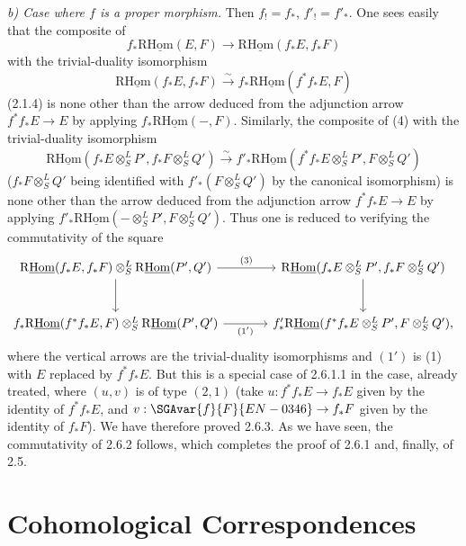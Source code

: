 \emph{b) Case where $f$ is a proper morphism.} Then $f_!=f_*$, $f'_!=f'_*$. One sees easily that the composite of
\[
f_*\mathrm{R}\underline{\mathrm{Hom}}(E,F)\longrightarrow\mathrm{R}\underline{\mathrm{Hom}}(f_*E,f_*F)
\]
with the trivial-duality isomorphism
\[
\mathrm{R}\underline{\mathrm{Hom}}(f_*E,f_*F)\xrightarrow{\sim}f_*\mathrm{R}\underline{\mathrm{Hom}}(f^{*}f_*E,F)
\]
(2.1.4) is none other than the arrow deduced from the adjunction arrow $f^{*}f_*E\to E$ by applying $f_*\mathrm{R}\underline{\mathrm{Hom}}(-,F)$. Similarly, the composite of (4) with the trivial-duality isomorphism
\[
\mathrm{R}\underline{\mathrm{Hom}}(f_*E\otimes^L_SP',f_*F\otimes^L_SQ')\xrightarrow{\sim}f'_*\mathrm{R}\underline{\mathrm{Hom}}(f^{*}f_*E\otimes^L_SP',F\otimes^L_SQ')
\]
($f_*F\otimes^L_SQ'$ being identified with $f'_*(F\otimes^L_SQ')$ by the canonical isomorphism) is none other than the arrow deduced from the adjunction arrow $f^{*}f_*E\to E$ by applying $f'_*\mathrm{R}\underline{\mathrm{Hom}}(-\otimes^L_SP',F\otimes^L_SQ')$. Thus one is reduced to verifying the commutativity of the square
\[
\begin{tikzcd}[column sep=large,row sep=large]
\mathrm{R}\underline{\mathrm{Hom}}(f_*E,f_*F)\otimes^L_S\mathrm{R}\underline{\mathrm{Hom}}(P',Q') \arrow[r,"(3)"] \arrow[d] & \mathrm{R}\underline{\mathrm{Hom}}(f_*E\otimes^L_SP',f_*F\otimes^L_SQ') \arrow[d]\\
f_*\mathrm{R}\underline{\mathrm{Hom}}(f^{*}f_*E,F)\otimes^L_S\mathrm{R}\underline{\mathrm{Hom}}(P',Q') \arrow[r,"(1')"'] & f'_*\mathrm{R}\underline{\mathrm{Hom}}(f^{*}f_*E\otimes^L_SP',F\otimes^L_SQ'),
\end{tikzcd}
\]
where the vertical arrows are the trivial-duality isomorphisms and $(1')$ is (1) with $E$ replaced by $f^{*}f_*E$. But this is a special case of 2.6.1.1 in the case, already treated, where $(u,v)$ is of type $(2,1)$ (take $u:f^{*}f_*E\to f_*E$ given by the identity of $f^{*}f_*E$, and $v:\SGAvar{f}{F}{EN-0346}\to f_*F$ given by the identity of $f_*F$). We have therefore proved 2.6.3. As we have seen, the commutativity of 2.6.2 follows, which completes the proof of 2.6.1 and, finally, of 2.5.

\clearpage
\section{Cohomological Correspondences}

